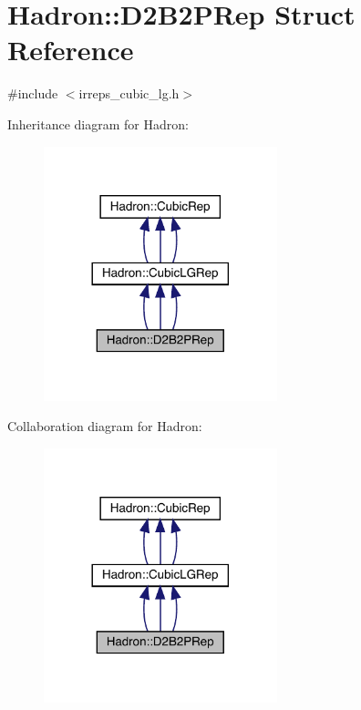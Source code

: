 \hypertarget{structHadron_1_1D2B2PRep}{}\section{Hadron\+:\+:D2\+B2\+P\+Rep Struct Reference}
\label{structHadron_1_1D2B2PRep}


{\ttfamily \#include $<$irreps\+\_\+cubic\+\_\+lg.\+h$>$}



Inheritance diagram for Hadron\+:
\nopagebreak
\begin{figure}[H]
\begin{center}
\leavevmode
\includegraphics[width=192pt]{d3/d05/structHadron_1_1D2B2PRep__inherit__graph}
\end{center}
\end{figure}


Collaboration diagram for Hadron\+:
\nopagebreak
\begin{figure}[H]
\begin{center}
\leavevmode
\includegraphics[width=192pt]{da/dd2/structHadron_1_1D2B2PRep__coll__graph}
\end{center}
\end{figure}
